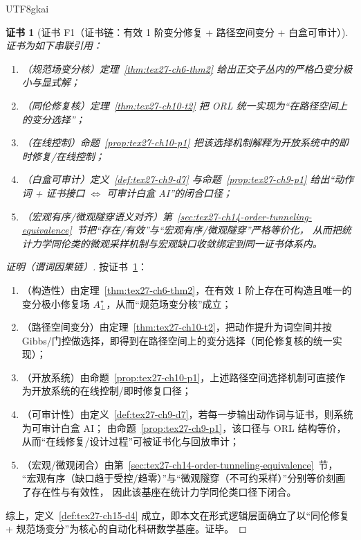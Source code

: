 \documentclass[12pt]{article}
\newtheorem{Certificate}{证书}[section]
\begin{document}
\begin{CJK*}{UTF8}{gkai}
\begin{Certificate}[证书 F1（证书链：有效 1 阶变分修复 + 路径空间变分 + 白盒可审计）]
\label{cert:tex27-ch15-f1}
证书为如下串联引用：
\begin{enumerate}
  \item（规范场变分核）定理~\ref{thm:tex27-ch6-thm2} 给出正交子丛内的严格凸变分极小与显式解；
  \item（同伦修复核）定理~\ref{thm:tex27-ch10-t2} 把 ORL 统一实现为“在路径空间上的变分选择”；
  \item（在线控制）命题~\ref{prop:tex27-ch10-p1} 把该选择机制解释为开放系统中的即时修复/在线控制；
  \item（白盒可审计）定义~\ref{def:tex27-ch9-d7} 与命题~\ref{prop:tex27-ch9-p1} 给出“动作词 + 证书接口 $\Leftrightarrow$ 可审计白盒 AI”的闭合口径；
  \item（宏观有序/微观隧穿语义对齐）第~\ref{sec:tex27-ch14-order-tunneling-equivalence}~节把“存在/有效”与“宏观有序/微观隧穿”严格等价化，
  从而把统计力学同伦类的微观采样机制与宏观缺口收敛绑定到同一证书体系内。
\end{enumerate}
\end{Certificate}

\begin{proof}[证明（谓词因果链）]
按证书~\ref{cert:tex27-ch15-f1}：
\begin{enumerate}
  \item（构造性）由定理~\ref{thm:tex27-ch6-thm2}，在有效 1 阶上存在可构造且唯一的变分极小修复场 $A_{\perp}^\star$，从而“规范场变分核”成立；
  \item（路径空间变分）由定理~\ref{thm:tex27-ch10-t2}，把动作提升为词空间并按 Gibbs/门控做选择，即得到在路径空间上的变分选择（同伦修复核的统一实现）；
  \item（开放系统）由命题~\ref{prop:tex27-ch10-p1}，上述路径空间选择机制可直接作为开放系统的在线控制/即时修复口径；
  \item（可审计性）由定义~\ref{def:tex27-ch9-d7}，若每一步输出动作词与证书，则系统为可审计白盒 AI；
  由命题~\ref{prop:tex27-ch9-p1}，该口径与 ORL 结构等价，从而“在线修复/设计过程”可被证书化与回放审计；
  \item（宏观/微观闭合）由第~\ref{sec:tex27-ch14-order-tunneling-equivalence}~节，
  “宏观有序（缺口趋于受控/趋零）”与“微观隧穿（不可约采样）”分别等价刻画了存在性与有效性，
  因此该基座在统计力学同伦类口径下闭合。
\end{enumerate}
综上，定义~\ref{def:tex27-ch15-d4} 成立，即本文在形式逻辑层面确立了以“同伦修复 + 规范场变分”为核心的自动化科研数学基座。证毕。
\end{proof}


\end{CJK*}
\end{document}
